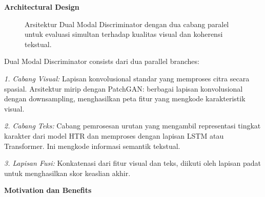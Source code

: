 \documentclass[12pt,a4paper]{article}
\begin{document}
\textbf{Architectural Design}

\begin{figure}[H]
\centering
\caption{Arsitektur Dual Modal Discriminator dengan dua cabang paralel untuk evaluasi simultan terhadap kualitas visual dan koherensi tekstual.}
\label{fig:dual-modal-discriminator}
\end{figure}

Dual Modal Discriminator consists dari dua parallel branches:

\textit{1. Cabang Visual:} Lapisan konvolusional standar yang memproses citra secara spasial. Arsitektur mirip dengan PatchGAN: berbagai lapisan konvolusional dengan downsampling, menghasilkan peta fitur yang mengkode karakteristik visual.

\textit{2. Cabang Teks:} Cabang pemrosesan urutan yang mengambil representasi tingkat karakter dari model HTR dan memproses dengan lapisan LSTM atau Transformer. Ini mengkode informasi semantik tekstual.

\textit{3. Lapisan Fusi:} Konkatenasi dari fitur visual dan teks, diikuti oleh lapisan padat untuk menghasilkan skor keaslian akhir.

\textbf{Motivation dan Benefits}
\end{document}
